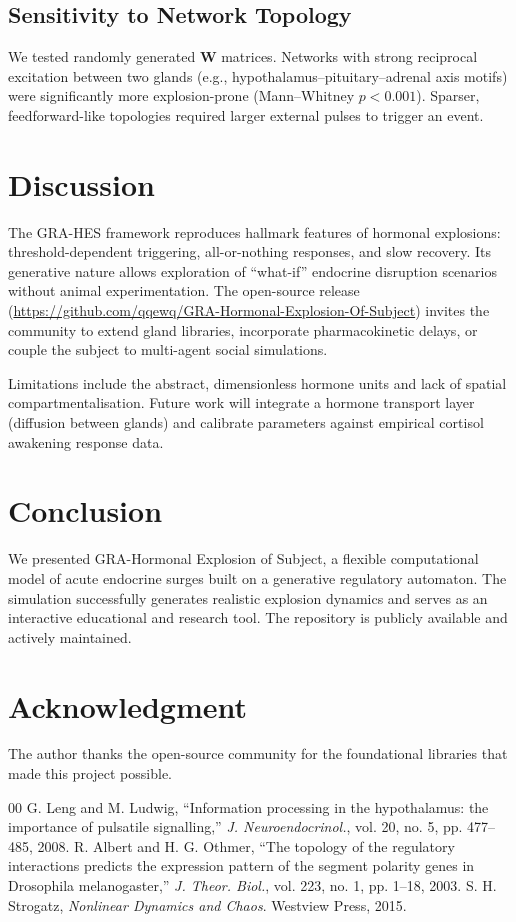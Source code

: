 \documentclass[conference]{IEEEtran}
\begin{document}
\subsection{Sensitivity to Network Topology}
We tested randomly generated $\mathbf{W}$ matrices. Networks with strong reciprocal excitation between two glands (e.g., hypothalamus–pituitary–adrenal axis motifs) were significantly more explosion-prone (Mann–Whitney $p < 0.001$). Sparser, feedforward-like topologies required larger external pulses to trigger an event.

\section{Discussion}
The GRA-HES framework reproduces hallmark features of hormonal explosions: threshold-dependent triggering, all-or-nothing responses, and slow recovery. Its generative nature allows exploration of ``what-if'' endocrine disruption scenarios without animal experimentation. The open-source release (\url{https://github.com/qqewq/GRA-Hormonal-Explosion-Of-Subject}) invites the community to extend gland libraries, incorporate pharmacokinetic delays, or couple the subject to multi-agent social simulations.

Limitations include the abstract, dimensionless hormone units and lack of spatial compartmentalisation. Future work will integrate a hormone transport layer (diffusion between glands) and calibrate parameters against empirical cortisol awakening response data.

\section{Conclusion}
We presented GRA-Hormonal Explosion of Subject, a flexible computational model of acute endocrine surges built on a generative regulatory automaton. The simulation successfully generates realistic explosion dynamics and serves as an interactive educational and research tool. The repository is publicly available and actively maintained.

\section*{Acknowledgment}
The author thanks the open-source community for the foundational libraries that made this project possible.

\begin{thebibliography}{00}
G. Leng and M. Ludwig, ``Information processing in the hypothalamus: the importance of pulsatile signalling,'' \textit{J. Neuroendocrinol.}, vol. 20, no. 5, pp. 477–485, 2008.
R. Albert and H. G. Othmer, ``The topology of the regulatory interactions predicts the expression pattern of the segment polarity genes in Drosophila melanogaster,'' \textit{J. Theor. Biol.}, vol. 223, no. 1, pp. 1–18, 2003.
S. H. Strogatz, \textit{Nonlinear Dynamics and Chaos}. Westview Press, 2015.
\end{thebibliography}
\end{document}
